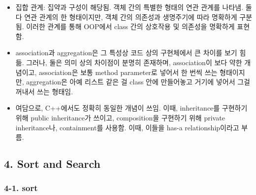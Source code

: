 \begin{itemize}
\tightlist
\item
  집합 관계: 집약과 구성이 해당됨. 객체 간의 특별한 형태의 연관 관계를
  나타냄. 둘 다 연관 관계의 한 형태이지만, 객체 간의 의존성과 생명주기에
  따라 명확하게 구분됨. 이러한 관계를 통해 OOP에서 class 간의 상호작용
  및 의존성을 명확하게 표현함.
\item
  association과 aggregation은 그 특성상 코드 상의 구현체에서 큰 차이를
  보기 힘듦. 그러나, 둘은 의미 상의 차이점이 분명히 존재하며,
  association이 보다 약한 개념이고, association은 보통 method
  parameter로 넣어서 한 번씩 쓰는 형태이지만, aggregation은 아예 리스트
  같은 걸 class 안에 만들어놓고 거기에 넣어서 그걸 꺼내서 쓰는 형태임.
\item
  여담으로, C++에서도 정확히 동일한 개념이 쓰임. 이때, inheritance를
  구현하기 위해 public inheritance가 쓰이고, composition을 구현하기 위해
  private inheritance나, containment를 사용함. 이때, 이들을 has-a
  relationship이라고 부름.
\end{itemize}



\hypertarget{sort-and-search}{%
\subsection{4. Sort and Search}\label{sort-and-search}}

\hypertarget{sort}{%
\subsubsection{4-1. sort}\label{sort}}

